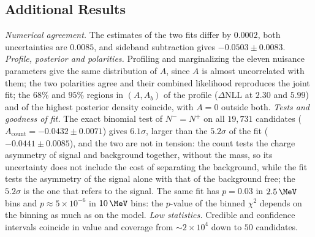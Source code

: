 \subsection{Additional Results}
\emph{Numerical agreement.} The estimates of the two fits differ by $0.0002$, both uncertainties are $0.0085$, and sideband subtraction gives $-0.0503\pm0.0083$.
\emph{Profile, posterior and polarities.} Profiling and marginalizing the eleven nuisance parameters give the same distribution of $A$, since $A$ is almost uncorrelated with them; the two polarities agree and their combined likelihood reproduces the joint fit; the $68\%$ and $95\%$ regions in $(A,A_b)$ of the profile ($\Delta\mathrm{NLL}$ at $2.30$ and $5.99$) and of the highest posterior density coincide, with $A=0$ outside both.
\emph{Tests and goodness of fit.} The exact binomial test of $N^-=N^+$ on all $19{,}731$ candidates ($A_{\mathrm{count}}=-0.0432\pm0.0071$) gives $6.1\sigma$, larger than the $5.2\sigma$ of the fit ($-0.0441\pm0.0085$), and the two are not in tension: the count tests the charge asymmetry of signal and background together, without the mass, so its uncertainty does not include the cost of separating the background, while the fit tests the asymmetry of the signal alone with that of the background free; the $5.2\sigma$ is the one that refers to the signal. The same fit has $p=0.03$ in $2.5\,\MeV$ bins and $p\approx5\times10^{-6}$ in $10\,\MeV$ bins: the $p$-value of the binned $\chi^2$ depends on the binning as much as on the model.
\emph{Low statistics.} Credible and confidence intervals coincide in value and coverage from $\sim2\times10^4$ down to $50$ candidates.
